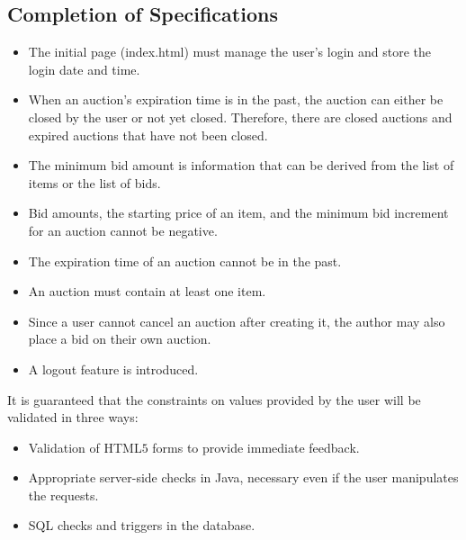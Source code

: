 \documentclass[12pt, a4paper, renqo, final]{amsart}
\begin{document}
	\subsection{Completion of Specifications}
	\begin{itemize}
		\item The initial page (index.html) must manage the user's login and store the login date and time.
		\item When an auction's expiration time is in the past, the auction can either be closed by the user or not yet closed. Therefore, there are closed auctions and expired auctions that have not been closed.
		\item The minimum bid amount is information that can be derived from the list of items or the list of bids.
		\item Bid amounts, the starting price of an item, and the minimum bid increment for an auction cannot be negative.
		\item The expiration time of an auction cannot be in the past.
		\item An auction must contain at least one item.
		\item Since a user cannot cancel an auction after creating it, the author may also place a bid on their own auction.
		\item A logout feature is introduced.
	\end{itemize}
	It is guaranteed that the constraints on values provided by the user will be validated in three ways:
	\begin{itemize}
		\item Validation of HTML$5$ forms to provide immediate feedback.
		\item Appropriate server-side checks in Java, necessary even if the user manipulates the requests.
		\item SQL checks and triggers in the database.
	\end{itemize}
\end{document}

